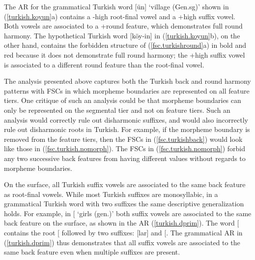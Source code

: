 \documentclass[,doc,floatsintext]{apa6}
\theoremstyle{definition}
\theoremstyle{definition}
\theoremstyle{definition}
\theoremstyle{remark}
\begin{document}
\noindent The AR for the grammatical Turkish word
{[}ün{]} `village (Gen.sg)' shown in
(\ref{turkish.koyun}a) contains a -high root-final vowel and a +high
suffix vowel. Both vowels are associated to a +round feature, which
demonstrates full round harmony. The hypothetical Turkish word
{[}köy-in{]} in (\ref{turkish.koyun}b), on the other hand, contains the
forbidden structure of (\ref{fsc.turkishround}a) in bold and red because
it does not demonstrate full round harmony; the +high suffix vowel is
associated to a different round feature than the root-final vowel.

The analysis presented above captures both the Turkish back and round
harmony patterns with FSCs in which morpheme boundaries are represented
on all feature tiers. One critique of such an analysis could be that
morpheme boundaries can only be represented on the segmental tier and
not on feature tiers. Such an analysis would correctly rule out
disharmonic suffixes, and would also incorrectly rule out disharmonic
roots in Turkish. For example, if the morpheme boundary is removed from
the feature tiers, then the FSCs in (\ref{fsc.turkishback}) would look
like those in (\ref{fsc.turkish.nomorph}). The FSCs in
(\ref{fsc.turkish.nomorph}) forbid any two successive back features from
having different values without regards to morpheme boundaries.

\begin{exe}
\ex \label{fsc.turkish.nomorph}
\end{exe}

On the surface, all Turkish suffix vowels are associated to the same
back feature as root-final vowels. While most Turkish suffixes are
monosyllabic, in a grammatical Turkish word with two suffixes the same
descriptive generalization holds. For example, in
{[}\textipa{\LARGE+}\textipa{1n}{]}
`girls (gen.)' both suffix vowels are associated to the same back
feature on the surface, as shown in the AR (\ref{turkish.dprim}). The
word
{[}\textipa{\LARGE+}\textipa{1n}{]}
contains the root {[}\textipa{k1z}{]} followed by two suffixes:
{[}lar{]} and {[}\textipa{1n}{]}. The grammatical AR in
(\ref{turkish.dprim}) thus demonstrates that all suffix vowels are
associated to the same back feature even when multiple suffixes are
present.
\end{document}
